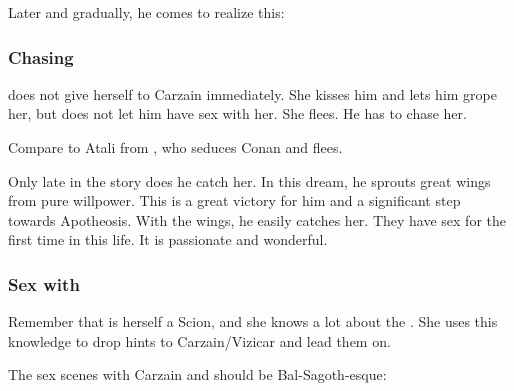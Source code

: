 Later and gradually, he comes to realize this: 
\begin{prose}
\end{prose}





\subsubsection{Chasing \Belzir}
\Belzir does not give herself to Carzain immediately.
She kisses him and lets him grope her, but does not let him have sex with her. 
She flees. 
He has to chase her. 

Compare to Atali from \cite{RobertEHoward:TheFrostGiantsDaughter}, who seduces Conan and flees. 

Only late in the story does he catch her. 
In this dream, he sprouts great wings from pure willpower. 
This is a great victory for him and a significant step towards Apotheosis.
With the wings, he easily catches her.
They have sex for the first time in this life. 
It is passionate and wonderful. 





\subsubsection{Sex with \Belzir}
Remember that \Belzir{} is herself a Scion, and she knows a lot about the \Malachim. She uses this knowledge to drop hints to Carzain/Vizicar and lead them on.

The sex scenes with Carzain and \Belzir{} should be Bal-Sagoth-esque: 


